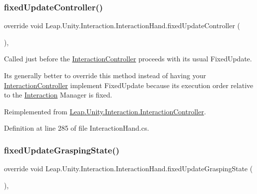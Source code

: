 \subsubsection{\texorpdfstring{fixedUpdateController()}{fixedUpdateController()}}
{\footnotesize\ttfamily override void Leap.\+Unity.\+Interaction.\+Interaction\+Hand.\+fixed\+Update\+Controller (\begin{DoxyParamCaption}{ }\end{DoxyParamCaption})\hspace{0.3cm}{\ttfamily [protected]}, {\ttfamily [virtual]}}



Called just before the \mbox{\hyperlink{class_leap_1_1_unity_1_1_interaction_1_1_interaction_controller}{Interaction\+Controller}} proceeds with its usual Fixed\+Update. 

It\textquotesingle{}s generally better to override this method instead of having your \mbox{\hyperlink{class_leap_1_1_unity_1_1_interaction_1_1_interaction_controller}{Interaction\+Controller}} implement Fixed\+Update because its execution order relative to the \mbox{\hyperlink{namespace_leap_1_1_unity_1_1_interaction}{Interaction}} Manager is fixed. 

Reimplemented from \mbox{\hyperlink{class_leap_1_1_unity_1_1_interaction_1_1_interaction_controller_ad66e5a09bdbe3e9573a504734bbc34f8}{Leap.\+Unity.\+Interaction.\+Interaction\+Controller}}.



Definition at line 285 of file Interaction\+Hand.\+cs.

\mbox{\label{class_leap_1_1_unity_1_1_interaction_1_1_interaction_hand_a899637eb040f88fa2cac4b27e4113684}} 
\subsubsection{\texorpdfstring{fixedUpdateGraspingState()}{fixedUpdateGraspingState()}}
{\footnotesize\ttfamily override void Leap.\+Unity.\+Interaction.\+Interaction\+Hand.\+fixed\+Update\+Grasping\+State (\begin{DoxyParamCaption}{ }\end{DoxyParamCaption})\hspace{0.3cm}{\ttfamily [protected]}, {\ttfamily [virtual]}}



